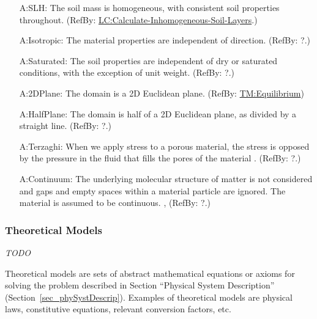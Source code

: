 \documentclass[12pt]{article}
\begin{document}
\begin{itemize}
  
  \item[A:SLH:\phantomsection\label{A:SLH}]{The soil mass is homogeneous,
  with consistent soil properties throughout. (RefBy:
  \hyperref[LC_inhomogeneous]{LC:Calculate-Inhomogeneous-Soil-Layers}.)}

  \item[A:Isotropic:\phantomsection\label{A:Isotropic}]{The material properties are independent of direction. (RefBy: ?.)}

  \item [A:Saturated:\phantomsection\label{A:Saturated}]{The soil properties are
  independent of dry or saturated conditions, with the exception of unit weight.
  (RefBy: ?.)}
          
  \item [A:2DPlane:\phantomsection\label{A:2DPlane}]{The domain is a 2D Euclidean plane. (RefBy: \hyperref[TM:Equilibrium]{TM:Equilibrium})}
  
  \item [A:HalfPlane:\phantomsection\label{A:HalfPlane}]{The domain is half of a
  2D Euclidean plane, as divided by a straight line. (RefBy: ?.)}

  \item [A:Terzaghi:\phantomsection\label{A:Terzaghi}]{When we apply stress to a
  porous material, the stress is opposed by the pressure in the fluid that fills
  the pores of the material \citep{WikipediaTerzaghi2022}. (RefBy: ?.)}

  \item [A:Continuum:\phantomsection\label{A:Continuum}]{The underlying molecular structure of matter is not considered and gaps and empty spaces within a material particle are ignored. The material is assumed to be continuous. \citep[p.\ 33--34]{Long1961}, \citep[p.\ 1-2]{Malvern1969} (RefBy: ?.)}

\end{itemize}
  
\subsubsection{Theoretical Models}\label{sec_theoretical}

\emph{TODO}

Theoretical models are sets of abstract mathematical equations or axioms for
solving the problem described in Section ``Physical System Description''
(Section~\ref{sec_phySystDescrip}). Examples of theoretical models are physical
laws, constitutive equations, relevant conversion factors, etc.
\end{document}
